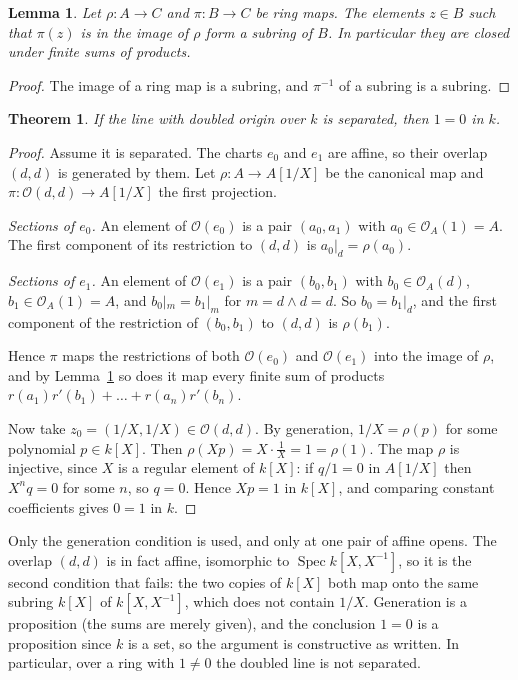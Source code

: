 \documentclass[11pt]{article}
\newtheorem{lemma}{Lemma}
\newtheorem{theorem}{Theorem}
\theoremstyle{remark}
\newcommand{\Spec}{\operatorname{Spec}}
\newcommand{\cO}{\mathcal{O}}
\begin{document}
\begin{lemma}\label{lem:lift}
Let $\rho\colon A\to C$ and $\pi\colon B\to C$ be ring maps. The elements
$z\in B$ such that $\pi(z)$ is in the image of $\rho$ form a subring of
$B$. In particular they are closed under finite sums of products.
\end{lemma}

\begin{proof}
The image of a ring map is a subring, and $\pi^{-1}$ of a subring is a
subring.
\end{proof}

\begin{theorem}
If the line with doubled origin over $k$ is separated, then $1=0$ in $k$.
\end{theorem}

\begin{proof}
Assume it is separated. The charts $e_0$ and $e_1$ are affine, so their
overlap $(d,d)$ is generated by them. Let $\rho\colon A\to A[1/X]$ be the
canonical map and $\pi\colon\cO(d,d)\to A[1/X]$ the first projection.

\emph{Sections of $e_0$.} An element of $\cO(e_0)$ is a pair $(a_0,a_1)$
with $a_0\in\cO_A(1)=A$. The first component of its restriction to
$(d,d)$ is $a_0|_d=\rho(a_0)$.

\emph{Sections of $e_1$.} An element of $\cO(e_1)$ is a pair $(b_0,b_1)$
with $b_0\in\cO_A(d)$, $b_1\in\cO_A(1)=A$, and $b_0|_m=b_1|_m$ for
$m=d\wedge d=d$. So $b_0=b_1|_d$, and the first component of the
restriction of $(b_0,b_1)$ to $(d,d)$ is $\rho(b_1)$.

Hence $\pi$ maps the restrictions of both $\cO(e_0)$ and $\cO(e_1)$ into
the image of $\rho$, and by Lemma~\ref{lem:lift} so does it map every
finite sum of products $r(a_1)r'(b_1)+\dots+r(a_n)r'(b_n)$.

Now take $z_0=(1/X,1/X)\in\cO(d,d)$. By generation, $1/X=\rho(p)$ for
some polynomial $p\in k[X]$. Then $\rho(Xp)=X\cdot\frac1X=1=\rho(1)$. The
map $\rho$ is injective, since $X$ is a regular element of $k[X]$: if
$q/1=0$ in $A[1/X]$ then $X^nq=0$ for some $n$, so $q=0$. Hence $Xp=1$ in
$k[X]$, and comparing constant coefficients gives $0=1$ in $k$.
\end{proof}

Only the generation condition is used, and only at one pair of affine
opens. The overlap $(d,d)$ is in fact affine, isomorphic to
$\Spec k[X,X^{-1}]$, so it is the second condition that fails: the two
copies of $k[X]$ both map onto the same subring $k[X]$ of $k[X,X^{-1}]$,
which does not contain $1/X$. Generation is a proposition (the sums are
merely given), and the conclusion $1=0$ is a proposition since $k$ is a
set, so the argument is constructive as written. In particular, over a
ring with $1\neq0$ the doubled line is not separated.
\end{document}
